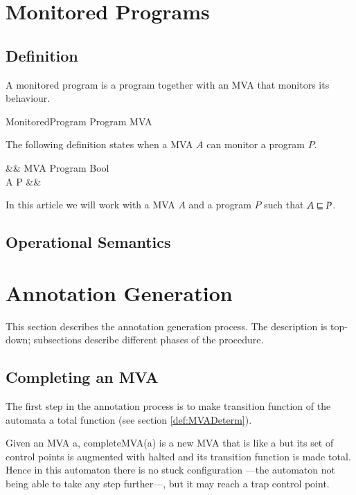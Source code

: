 \documentclass[a4paper,10pt]{article}
\begin{document}
\section{Monitored Programs}
\subsection{Definition}
A monitored program is a program together with an MVA that monitors its behaviour.
\begin{haskell}
MonitoredProgram \eqdef Program \times MVA
\end{haskell}

The following definition states when a MVA $A$ can monitor a program $P$.
\begin{haskell}
\sqsubseteq &\ofType& MVA \times Program \to Bool\\
A \modeled P &\eqdef&
\end{haskell}

In this article we will work with a MVA $A$ and a program $P$ such that $A \sqsubseteq P$. 

\subsection{Operational Semantics}



\section{Annotation Generation}\label{sec:AnnGen}
This section describes the annotation generation process. 
The description is top-down; subsections describe different phases of the procedure.


\subsection{Completing an MVA}\label{sec:CompMVA}
The first step in the annotation process is to make transition function of the automata a total function (see
section \ref{def:MVADeterm}).

Given an MVA \<a\>, \<completeMVA(a)\> is a new MVA that is like \<a\> but its set of control points is
augmented with \<halted\> and its transition function is made total. Hence in this automaton there is no stuck
configuration ---the automaton not being able to take any step further---, but it may reach a trap control
point.
\end{document}
